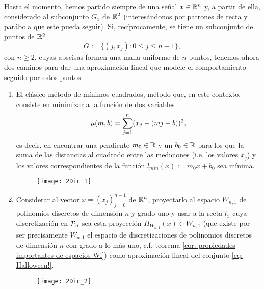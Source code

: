 Hasta el momento, hemos partido siempre
de una señal $x \in \mathbb{R}^{n}$
y, a partir de ella, considerado al subconjunto $G_{x}$ 
de $\mathbb{R}^{2}$ (interesándonos por patrones de 
recta y parábola que este pueda seguir).
Si, recíprocamente, se tiene un 
subconjunto de puntos de $\mathbb{R}^{2}$ 
\begin{equation}
\label{eq: Halloween!}
G:=\{(j, x_{j}): 0 \leq j \leq n-1 \},
\end{equation}
con $n \geq 2$,
cuyas abscisas formen una malla uniforme
de $n$ puntos, tenemos ahora dos caminos
para dar una aproximación lineal
que modele el comportamiento 
seguido por estos puntos:

\begin{enumerate}
\item El clásico método de
mínimos cuadrados, método que, en este contexto,
consiste en minimizar a la función
de dos variables 
\begin{equation}
\label{eq: funcion a minimizar}
\mu (m,b)= \sum\limits_{j=1}^{n}(x_{j}-(mj+b))^{2},
\end{equation}
es decir, en encontrar una pendiente
$m_{0} \in \mathbb{R}$ y un $b_{0} \in \mathbb{R}$ 
para los que la suma de las distancias
al cuadrado entre las mediciones 
(i.e. los valores $x_{j}$)
y los valores correspondientes de la función
$l_{min}(x):=m_{0}x+b_{0}$
sea mínima. 


\begin{figure}[H]
	\centering
	\texttt{[image: 2Dic\_1]} 
\end{figure}	


\item Considerar al vector $x=(x_{j})_{j=0}^{n-1}$
de $\mathbb{R}^{n}$, proyectarlo al espacio $W_{n,1}$ 
de polinomios discretos de dimensión $n$ y grado uno
y usar
a la recta $l_{x}$ cuya discretización en 
$\mathcal{P}_{n}$ sea esta proyección
$\Pi_{W_{n,1}}(x) \in W_{n,1}$ 
(que existe por ser precisamente
$W_{n,1}$ el espacio de discretizaciones
de polinomios discretos de dimensión $n$ con
grado a lo más uno, c.f. 
teorema \ref{cor: propiedades importantes de espacios Wi})
como aproximación lineal del conjunto \eqref{eq: Halloween!}.


\begin{figure}[H]
	\centering
	\texttt{[image: 2Dic\_2]} 
\end{figure}	

\end{enumerate}



